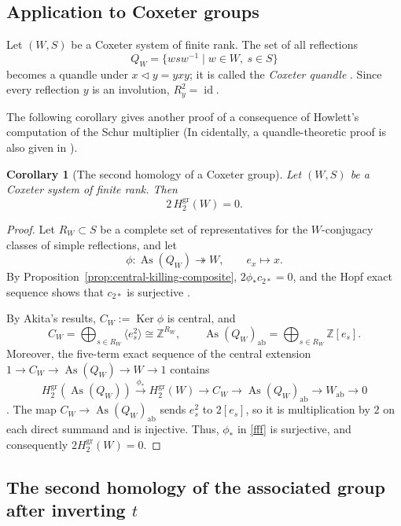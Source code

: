 \documentclass[11pt]{article}
\newtheorem{corollary}[theorem]{Corollary}
\DeclareMathOperator{\As}{As}
\DeclareMathOperator{\Ker}{Ker}
\newcommand{\ZZ}{\mathbb Z}
\newcommand{\gr}{\mathrm{gr}}
\newcommand{\ab}{\mathrm{ab}}
\begin{document}
\subsection{Application to Coxeter groups}
\label{subsec:coxeter-application}

Let $(W,S)$ be a Coxeter system of finite rank. The set of all reflections
\[
 Q_W=\{wsw^{-1}\mid w\in W,\ s\in S\}
\]
becomes a quandle under $x\lhd y=yxy$; it is called the \emph{Coxeter
quandle} \cite{AkitaCoxeter}. Since every reflection $y$ is an involution,
$R_y^2=\operatorname{id}$.


The following corollary gives another proof of a consequence of Howlett's computation of the Schur multiplier \cite{HowlettCoxeter} (In cidentally, a quandle-theoretic proof is also given in \cite[Corollary 4.4]{Akita2026}).
\begin{corollary}[The second homology of a Coxeter group]
\label{cor:coxeter-H2}
Let $(W,S)$ be a Coxeter system of finite rank. Then
\[
 2\,H_2^{\gr}(W)=0.
\]
\end{corollary}

\begin{proof}
Let $R_W\subset S$ be a complete set of representatives for the
$W$-conjugacy classes of simple reflections, and let
\[
 \phi\colon\As(Q_W)\twoheadrightarrow W,
 \qquad e_x\longmapsto x.
\]
By Proposition~\ref{prop:central-killing-composite},
$2\phi_*c_{2*}=0$, and the Hopf exact sequence shows that $c_{2*}$ is
surjective \cite[Chapter~II, \S5]{Brown}.

By Akita's results, $C_W:=\Ker\phi$ is central, and
\[
 C_W=\bigoplus_{s\in R_W}\langle e_s^2\rangle\cong\ZZ^{R_W},
 \qquad
 \As(Q_W)_{\ab}=\bigoplus_{s\in R_W}\ZZ[e_s].
\]
Moreover, the five-term exact sequence of the central extension
$1\to C_W\to\As(Q_W)\to W\to1$ contains
\begin{equation}\label{fff} 
 H_2^{\gr}(\As(Q_W)) \stackrel{\phi_*}{\longrightarrow} H_2^{\gr}(W)
 \longrightarrow C_W\longrightarrow\As(Q_W)_{\ab}
 \longrightarrow W_{\ab}\longrightarrow0
\end{equation} 
\cite[Proposition~2.4, Lemma~2.5 and Theorem~3.1]{AkitaCoxeter}. The map $C_W\to\As(Q_W)_{\ab}$ sends $e_s^2$ to $2[e_s]$, so it is
multiplication by $2$ on each direct summand and is injective. Thus,
$\phi_*$ in \eqref{fff} 
is surjective, and consequently $2H_2^{\gr}(W)=0$.
\end{proof}

\subsection{The second homology of the associated group after inverting \texorpdfstring{$t$}{t}}
\label{subsec:H2-away-from-type}
\end{document}
